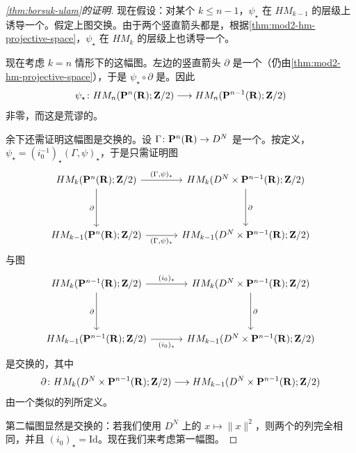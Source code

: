 \begin{proof}[\cref{thm:borsuk-ulam}的证明]
现在假设：对某个 $k\le n-1$，$\psi_\star$ 在 $HM_{k-1}$ 的层级上诱导一个\trIsomorphism。假定上图交换。由于两个竖直箭头都是\trIsomorphism，根据\cref{thm:mod2-hm-projective-space}，$\psi_\star$ 在 $HM_k$ 的层级上也诱导一个\trIsomorphism。

现在考虑 $k=n$ 情形下的这幅图。左边的竖直箭头 $\partial$ 是一个\trIsomorphism（仍由\cref{thm:mod2-hm-projective-space}），于是 $\psi_\star\circ\partial$ 是\trIsomorphism。因此
\[
\psi_\star\colon HM_n(\mathbf{P}^n(\mathbf{R});\mathbf{Z}/2)\longrightarrow HM_n(\mathbf{P}^{n-1}(\mathbf{R});\mathbf{Z}/2)
\]
非零，而这是荒谬的。

余下还需证明这幅图是交换的。设 $\Gamma\colon\mathbf{P}^n(\mathbf{R})\to D^N$ 是一个\trEmbedding。按定义，$\psi_\star=(i_0^{-1})_\star(\Gamma,\psi)_\star$，于是只需证明图
\[
\begin{tikzcd}[column sep=1.15cm,row sep=1.35cm]
HM_k(\CP^n(\RR);\ZZ/2) \ar[r,"{(\Gamma,\psi)_\star}"] \ar[d,"\partial"']
  & HM_k(D^N\times\CP^{n-1}(\RR);\ZZ/2) \ar[d,"\partial"] \\
HM_{k-1}(\CP^n(\RR);\ZZ/2) \ar[r,"{(\Gamma,\psi)_\star}"']
  & HM_{k-1}(D^N\times\CP^{n-1}(\RR);\ZZ/2)
\end{tikzcd}
\]
与图
\[
\begin{tikzcd}[column sep=1.15cm,row sep=1.35cm]
HM_k(\CP^{n-1}(\RR);\ZZ/2) \ar[r,"{(i_0)_\star}"] \ar[d,"\partial"']
  & HM_k(D^N\times\CP^{n-1}(\RR);\ZZ/2) \ar[d,"\partial"] \\
HM_{k-1}(\CP^{n-1}(\RR);\ZZ/2) \ar[r,"{(i_0)_\star}"']
  & HM_{k-1}(D^N\times\CP^{n-1}(\RR);\ZZ/2)
\end{tikzcd}
\]
是交换的，其中
\[
\partial\colon HM_k(D^N\times\mathbf{P}^{n-1}(\mathbf{R});\mathbf{Z}/2)
  \longrightarrow HM_{k-1}(D^N\times\mathbf{P}^{n-1}(\mathbf{R});\mathbf{Z}/2)
\]
由一个类似的\trComplex\trExact{}列所定义。

第二幅图显然是交换的：若我们使用 $D^N$ 上的\trMorseFunction{} $x\mapsto\|x\|^2$，则两个\trComplex{}的\trExact{}列完全相同，并且 $(i_0)_\star=\mathrm{Id}$。现在我们来考虑第一幅图。


\end{proof}
